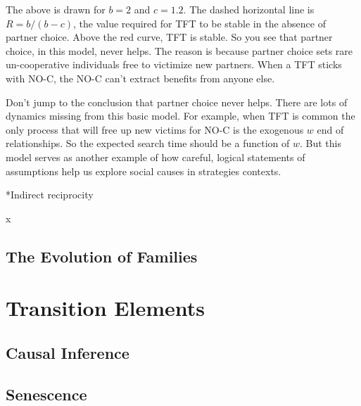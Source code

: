 \documentclass[10pt,reqno]{amsbook}
\makeatletter
\renewcommand\section{\@startsection{section}{1}
\z@{.7\linespacing\@plus\linespacing}{.5\linespacing}
{\large\bfseries\itshape}}
\numberwithin{equation}{chapter}
\makeatother
\begin{document}
The above is drawn for $b=2$ and $c=1.2$. The dashed horizontal line is $R=b/(b-c)$, the value required for TFT to be stable in the absence of partner choice. Above the red curve, TFT is stable. So you see that partner choice, in this model, never helps. The reason is because partner choice sets rare un-cooperative individuals free to victimize new partners. When a TFT sticks with NO-C, the NO-C can't extract benefits from anyone else.

Don't jump to the conclusion that partner choice never helps. There are lots of dynamics missing from this basic model. For example, when TFT is common the only process that will free up new victims for NO-C is the exogenous $w$ end of relationships. So the expected search time should be a function of $w$. But this model serves as another example of how careful, logical statements of assumptions help us explore social causes in strategies contexts.


\section*{Indirect reciprocity}

x



\def \chapterElement {K}
\chapter{The Evolution of Families}

\lipsum[12-14]


\part{Transition Elements}




\setcounter{chapter}{6}
\def \chapterElement {Ki}
\chapter{Causal Inference}


\lipsum[2-4]




\setcounter{chapter}{10}
\def \chapterElement {Se}
\chapter{Senescence}
\end{document}
